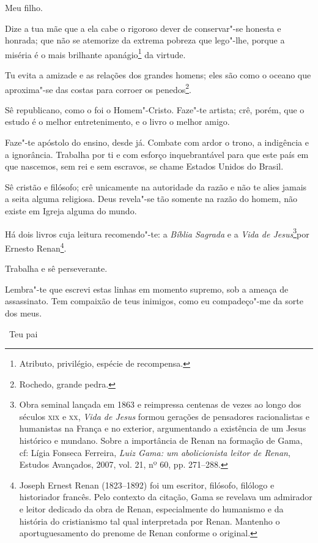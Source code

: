 Meu filho.

Dize a tua mãe que a ela cabe o rigoroso dever de conservar"-se honesta e
honrada; que não se atemorize da extrema pobreza que lego"-lhe, porque a
miséria é o mais brilhante apanágio\footnote{Atributo, privilégio,
  espécie de recompensa.} da virtude.

Tu evita a amizade e as relações dos grandes homens; eles são como o
oceano que aproxima"-se das costas para corroer os penedos\footnote{
  Rochedo, grande pedra.}.

Sê republicano, como o foi o Homem"-Cristo. Faze"-te artista; crê, porém,
que o estudo é o melhor entretenimento, e o livro o melhor amigo.

Faze"-te apóstolo do ensino, desde já. Combate com ardor o trono, a
indigência e a ignorância. Trabalha por ti e com esforço inquebrantável
para que este país em que nascemos, sem rei e sem escravos, se chame
Estados Unidos do Brasil.

Sê cristão e filósofo; crê unicamente na autoridade da razão e não te
alies jamais a seita alguma religiosa. Deus revela"-se tão somente na
razão do homem, não existe em Igreja alguma do mundo.

Há dois livros cuja leitura recomendo"-te: a \emph{Bíblia Sagrada} e a
\emph{Vida de Jesus}\footnote{Obra seminal lançada em 1863 e
  reimpressa centenas de vezes ao longo dos séculos \textsc{xix} e \textsc{xx}, \emph{Vida
  de Jesus} formou gerações de pensadores racionalistas e humanistas na
  França e no exterior, argumentando a existência de um Jesus histórico
  e mundano. Sobre a importância de Renan na formação de Gama, cf: Lígia
  Fonseca Ferreira, \emph{Luiz Gama: um abolicionista leitor de Renan},
  Estudos Avançados, 2007, vol. 21, nº 60, pp. 271--288.}por Ernesto
Renan\footnote{Joseph Ernest Renan (1823--1892) foi um escritor,
  filósofo, filólogo e historiador francês. Pelo contexto da citação,
  Gama se revelava um admirador e leitor dedicado da obra de Renan,
  especialmente do humanismo e da história do cristianismo tal qual
  interpretada por Renan. Mantenho o aportuguesamento do prenome de
  Renan conforme o original.}.

Trabalha e sê perseverante.

Lembra"-te que escrevi estas linhas em momento supremo, sob a ameaça de
assassinato. Tem compaixão de teus inimigos, como eu compadeço"-me da
sorte dos meus.

\vfill

\hfill\ Teu pai

